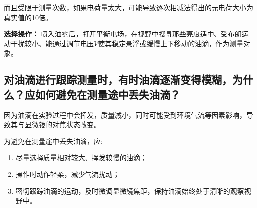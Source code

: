 \documentclass[yuxi]{../template/Report}%
\begin{document}
\begin{fullreportonly}
\begin{enumerate}
    而且受限于测量次数，如果电荷量太大，可能导致逐次相减法得出的元电荷大小为真实值的10倍。
\end{enumerate}
\textbf{选择操作：} 喷入油雾后，打开平衡电场，在视野中搜寻那些亮度适中、受布朗运动干扰较小、能通过调节电压$V$使其稳定悬浮或缓慢上下移动的油滴，作为测量对象。


\subsection{对油滴进行跟踪测量时，有时油滴逐渐变得模糊，为什么？应如何避免在测量途中丢失油滴？}
因为油滴在实验过程中会挥发，质量减小，同时可能受到环境气流等因素影响，导致其与显微镜的对焦状态改变。

\vspace{2mm}
为避免在测量途中丢失油滴，应:
\begin{enumerate}
    \item 尽量选择质量相对较大、挥发较慢的油滴；
    \item 操作时动作轻柔，减少气流扰动；
    \item 密切跟踪油滴的运动，及时微调显微镜焦距，保持油滴始终处于清晰的观察视野中。
\end{enumerate}
\end{fullreportonly}
\insertnotes
\end{document}
